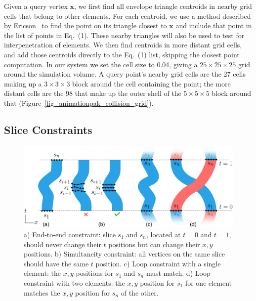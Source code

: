 Given a query vertex $\bm{x}$, we first find all envelope triangle
centroids in nearby grid cells that belong to other elements.  For each 
centroid, we use a method described by Ericson~\cite{Ericson2005} to
find the point on its triangle closest to $\bm{x}$ and
include that point in the list of points in Eq.~(1).  These
nearby triangles will also be used to test for interpenetration of elements.
We then find centroids in more distant grid cells, and add
those centroids directly to the Eq.~(1) list, skipping the closest point computation.
In our system we set the cell size to 0.04, giving a $25\times 25\times 25$
grid around the simulation volume.  A query point's nearby grid cells 
are the 27 cells making up a $3\times 3\times 3$ block around the cell 
containing the point; the more distant cells are the 98 that make up the
outer shell of the $5\times 5\times 5$ block around that 
(Figure~\ref{fig_animationpak_collision_grid}).


\subsection{Slice Constraints}
\label{animationpak_slice_constraints}

\begin{figure}[t]
\centering
\includegraphics[width=1.0\textwidth]{figures/animationpak/constraints.pdf} 
\caption[Constraints]
{\label{fig_animationpak_constraints} 
a) End-to-end constraint: 
slice $s_1$ and $s_n$, located at 
$t = 0$ and $t = 1$,  should never change their $t$ positions but can change their $x, y$ positions. 
b) Simultaneity constraint: all vertices on the same slice should have the same $t$ position.
c) Loop constraint with a single element: the $x,y$ positions for $s_1$ and $s_n$ must match.
d) Loop constraint with two elements: the $x, y$ position for $s_1$  
for one element matches the $x, y$ position for $s_n$ of the other.
}
\end{figure}



